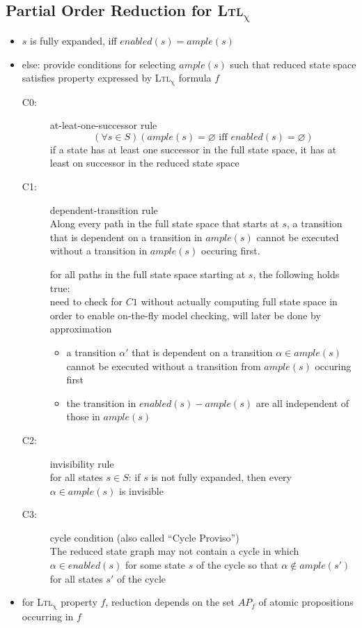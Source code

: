 \documentclass[a4paper, 10pt]{article}
\begin{document}
\subsection*{Partial Order Reduction for \textsc{Ltl}$_\upchi$}
\begin{shaded}
    \begin{itemize}
        \item $s$ is fully expanded, iff $enabled(s)=ample(s)$
        \item else: provide conditions for selecting $ample(s)$ such that reduced state space satisfies property expressed by \textsc{Ltl}$_\upchi$ formula $f$
        \begin{description}
            \item[C0:] at-leat-one-successor rule
            \[ (\forall s\in S)(ample(s)=\varnothing \textrm{ iff } enabled(s)=\varnothing) \]
            {\tiny if a state has at least one successor in the full state space, it has at least on successor in the reduced state space}
            \item[C1:] dependent-transition rule \\
            Along every path in the full state space that starts at $s$, a transition that is dependent on a transition in $ample(s)$ cannot be executed without a transition in $ample(s)$ occuring first.

            for all paths in the full state space starting at $s$, the following holds true: \\
            {\tiny need to check for $C1$ without actually computing full state space in order to enable on-the-fly model checking, will later be done by approximation}
            \begin{itemize}
                \item a transition $\alpha'$ that is dependent on a transition $\alpha\in ample(s)$ cannot be executed without a transition from $ample(s)$ occuring first
                \item the transition in $enabled(s)-ample(s)$ are all independent of those in $ample(s)$
            \end{itemize}
            \item[C2:] invisibility rule \\
            for all states $s\in S$: if $s$ is not fully expanded, then every $\alpha\in ample(s)$ is invisible
            \item[C3:] cycle condition {\tiny (also called ``Cycle Proviso'')} \\
            The reduced state graph may not contain a cycle in which $\alpha\in enabled(s)$ for some state $s$ of the cycle so that $\alpha\not\in ample(s')$ for all states $s'$ of the cycle
        \end{description}
        \item for \textsc{Ltl}$_\upchi$ property $f$, reduction depends on the set $AP_f$ of atomic propositions occurring in $f$
    \end{itemize}
\end{shaded}
\end{document}

